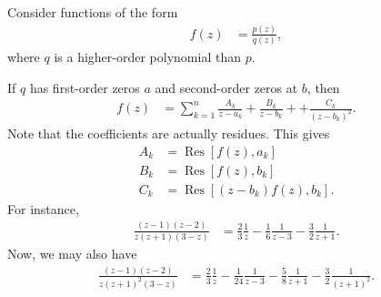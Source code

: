 \documentclass[10pt]{mypackage}
\DeclareMathOperator{\res}{Res}
\begin{document}
  \begin{example}
    Consider functions of the form
    \begin{align*}
      f(z) &= \frac{p(z)}{q(z)},
    \end{align*}
    where $q$ is a higher-order polynomial than $p$.\newline

    If $q$ has first-order zeros $a$ and second-order zeros at $b$, then
    \begin{align*}
      f(z) &= \sum_{k=1}^{n}\frac{A_k}{z-a_k} + \frac{B_k}{z-b_k} + + \frac{C_k}{\left( z-b_k \right)^2}.
    \end{align*}
    Note that the coefficients are actually residues. This gives
    \begin{align*}
      A_k &= \res\left[ f(z),a_k \right]\\
      B_k &= \res\left[ f(z),b_k \right]\\
      C_k &= \res\left[ (z-b_k)f(z),b_k \right].
    \end{align*}
    For instance,
    \begin{align*}
      \frac{\left( z-1 \right)\left( z-2 \right)}{z\left( z+1 \right)\left( 3-z \right)} &= \frac{2}{3}\frac{1}{z} - \frac{1}{6}\frac{1}{z-3} - \frac{3}{2}\frac{1}{z+1}.
    \end{align*}
    Now, we may also have
    \begin{align*}
      \frac{\left( z-1 \right)\left( z-2 \right)}{z\left( z+1 \right)^2\left( 3-z \right)} &= \frac{2}{3}\frac{1}{z} - \frac{1}{24}\frac{1}{z-3} - \frac{5}{8}\frac{1}{z+1} - \frac{3}{2}\frac{1}{\left( z+1 \right)^2}.
    \end{align*}
  \end{example}
\end{document}
